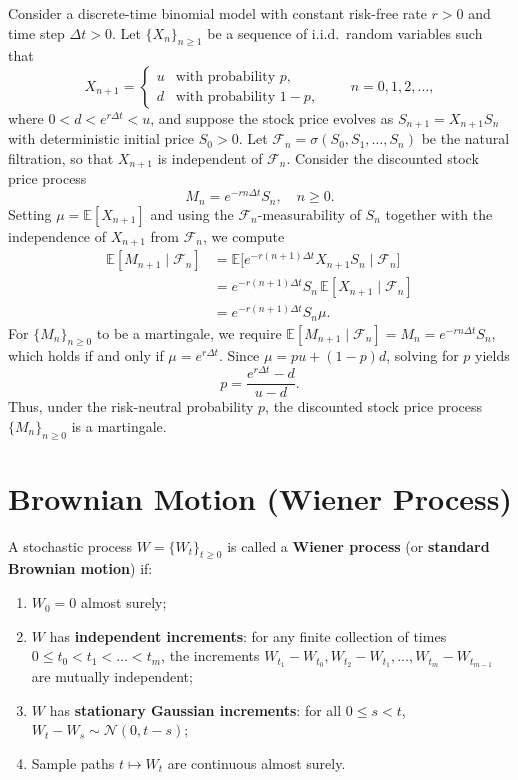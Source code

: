 \begin{example}
\label{ex:binomial-martingale}
Consider a discrete-time binomial model with constant risk-free rate $r > 0$ and time step $\Delta t > 0$. Let $\{X_n\}_{n \ge 1}$ be a sequence of i.i.d.\ random variables such that
\[
X_{n+1} =
\begin{cases}
    u & \text{with probability } p, \\
    d & \text{with probability } 1-p,
\end{cases}
\qquad n = 0, 1, 2, \dots,
\]
where $0 < d < e^{r\Delta t} < u$, and suppose the stock price evolves as $S_{n+1} = X_{n+1} S_n$ with deterministic initial price $S_0 > 0$. Let $\mathcal{F}_n = \sigma(S_0, S_1, \dots, S_n)$ be the natural filtration, so that $X_{n+1}$ is independent of $\mathcal{F}_n$. Consider the discounted stock price process
\[
M_n = e^{-r n \Delta t} S_n, \quad n \ge 0.
\]
Setting $\mu = \mathbb{E}[X_{n+1}]$ and using the $\mathcal{F}_n$-measurability of $S_n$ together with the independence of $X_{n+1}$ from $\mathcal{F}_n$, we compute
\begin{align*}
\mathbb{E}[M_{n+1} \mid \mathcal{F}_n]
&= \mathbb{E}\big[e^{-r(n+1)\Delta t} X_{n+1} S_n \mid \mathcal{F}_n\big] \\
&= e^{-r(n+1)\Delta t} S_n \, \mathbb{E}[X_{n+1} \mid \mathcal{F}_n] \\
&= e^{-r(n+1)\Delta t} S_n \mu.
\end{align*}
For $\{M_n\}_{n \ge 0}$ to be a martingale, we require $\mathbb{E}[M_{n+1} \mid \mathcal{F}_n] = M_n = e^{-r n \Delta t} S_n$, which holds if and only if $\mu = e^{r\Delta t}$. Since $\mu = p u + (1-p) d$, solving for $p$ yields
\[
p = \frac{e^{r\Delta t} - d}{u - d}.
\]
Thus, under the risk-neutral probability $p$, the discounted stock price process $\{M_n\}_{n \ge 0}$ is a martingale.
\end{example}

\section{Brownian Motion (Wiener Process)}

\begin{definition}
\label{def:wiener-process}
A stochastic process $W = \{W_t\}_{t \ge 0}$ is called a \textbf{Wiener process} (or \textbf{standard Brownian motion}) if:
\begin{enumerate}
    \item $W_0 = 0$ almost surely;
    \item $W$ has \textbf{independent increments}: for any finite collection of times $0 \le t_0 < t_1 < \dots < t_m$, the increments $W_{t_1} - W_{t_0}, W_{t_2} - W_{t_1}, \dots, W_{t_m} - W_{t_{m-1}}$ are mutually independent;
    \item $W$ has \textbf{stationary Gaussian increments}: for all $0 \le s < t$, $W_t - W_s \sim \mathcal{N}(0, t-s)$;
    \item Sample paths $t \mapsto W_t$ are continuous almost surely.
\end{enumerate}
\end{definition}

